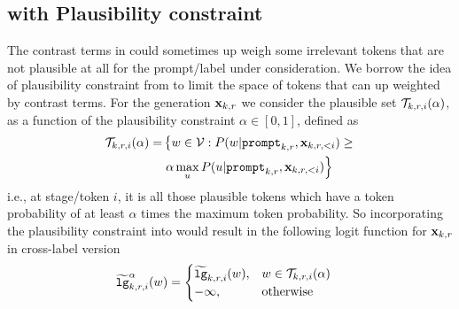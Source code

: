 \subsection{\corrsyn{} with Plausibility constraint}
\label{sec:plaus}
The contrast terms in \corrsyn{} could sometimes up weigh some irrelevant tokens that are not plausible at all for the prompt/label under consideration. We borrow the idea of plausibility constraint from \cite{li2023contrastive, o2023contrastive} to limit the space of tokens that can up weighted by contrast terms. For the generation $\mathbf{x}_{k,r}$ we consider the plausible set $\mathcal{T}_{k,r,i}(\alpha)$, as a function of the plausibility constraint $\alpha\in [0,1]$, defined as 
\begin{align}
    \mathcal{T}_{k,r,i}(\alpha)=&\left\{w\in\mathcal{V}: P(w|\mathtt{prompt}_{k,r},\mathbf{x}_{k,r,<i})\geq \right.\nonumber\\
    &\left.\alpha \max_u P(u|\mathtt{prompt}_{k,r},\mathbf{x}_{k,r,<i})\right\}\label{eq:plaus_set}
\end{align}
i.e., at stage/token $i$, it is all those plausible tokens which have a token probability of at least $\alpha$ times the maximum token probability. So incorporating the plausibility constraint into  \corrsyn{} would result in the following logit function for $\mathbf{x}_{k,r}$ in cross-label version
\begin{align}
 &\widetilde {\mathtt{lg}}^{\alpha}_{k,r,i}(w) = \begin{cases}
    \widetilde{\mathtt{lg}}_{k,r,i}(w), & w\in \mathcal{T}_{k,r,i}(\alpha)\\
    -\infty, & \mathrm{otherwise}
\end{cases} \label{eq:K-Corr-cross-logit-plaus-1}
\end{align}


